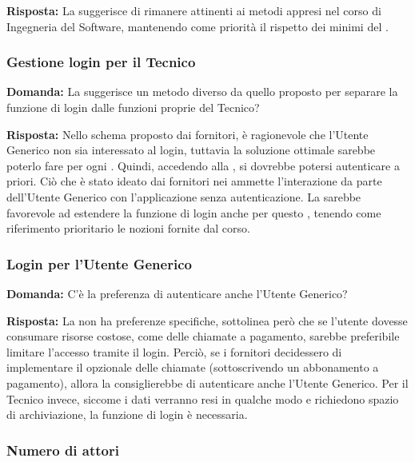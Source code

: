 \textbf{Risposta:} La  suggerisce di rimanere attinenti ai metodi appresi nel corso di Ingegneria del Software, mantenendo come priorità il rispetto dei  minimi del .

\subsubsection{Gestione login per il Tecnico}

\textbf{Domanda:} La  suggerisce un metodo diverso da quello proposto per separare la funzione di login dalle funzioni proprie del Tecnico?

\textbf{Risposta:} Nello schema proposto dai fornitori, è ragionevole che l'Utente Generico non sia interessato al login, tuttavia la soluzione ottimale sarebbe poterlo fare per ogni . Quindi, accedendo alla , si dovrebbe potersi autenticare a priori.
Ciò che è stato ideato dai fornitori nei  ammette l'interazione da parte dell'Utente Generico con l'applicazione senza autenticazione. La  sarebbe favorevole ad estendere la funzione di login anche per questo , tenendo come riferimento prioritario le nozioni fornite dal corso. 

\subsubsection{Login per l'Utente Generico}

\textbf{Domanda:} C'è la preferenza di autenticare anche l'Utente Generico?

\textbf{Risposta:} La  non ha preferenze specifiche, sottolinea però che se l'utente dovesse consumare risorse costose, come delle chiamate  a pagamento, sarebbe preferibile limitare l'accesso tramite il login. Perciò, se i fornitori decidessero di implementare il  opzionale delle chiamate  (sottoscrivendo un abbonamento a pagamento), allora la  consiglierebbe di autenticare anche l'Utente Generico. Per il Tecnico invece, siccome i dati verranno resi in qualche modo  e richiedono spazio di archiviazione, la funzione di login è necessaria.

\subsubsection{Numero di attori}

